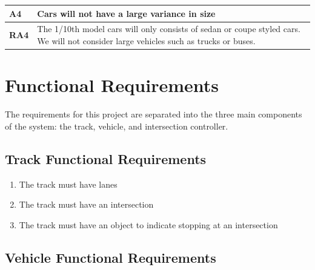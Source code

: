 \documentclass [12pt]{article}
\begin{document}
\begin{longtable}{| p{ } | p{ } | }\hline 
\textbf{A4} & \textbf{Cars will not have a large variance in size} \\ \hline
\textbf{RA4} &  The 1/10th model cars will only consists of sedan or coupe styled cars. We will not consider large vehicles such as trucks or buses.\\ \hline
\end{longtable}






\section {Functional Requirements} 
The requirements for this project are separated into the three main components of the system: the track, vehicle, and intersection controller.





\subsection{Track Functional Requirements}
\begin{enumerate}[label=\textbf{T\arabic*:},leftmargin =0.8in]
	\item The track must have lanes
	\item The track must have an intersection
	\item The track must have an object to indicate stopping at an intersection
\end{enumerate}


\subsection{Vehicle Functional Requirements}
\end{document}
